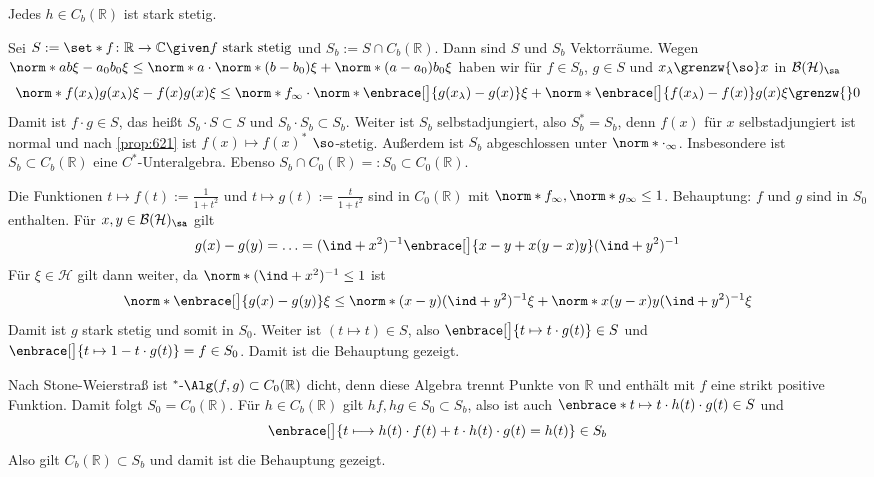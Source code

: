 \begin{proposition}[label=prop:623,{name=[jede beschränkte stetige Funktion ist stark stetig]}]
	Jedes $h \in C_b(\mathbb{R})$ ist stark stetig.
\end{proposition}
\begin{beweis}
	Sei $S := \set*{f \colon \mathbb{R}\to \mathbb{C} \given f \text{ stark stetig}}$ und $S_b := S \cap C_b(\mathbb{R})$.
	Dann sind $S$ und $S_b$ Vektorräume. 
	Wegen $\norm*{ab \xi - a_0 b_0 \xi} \le \norm*{a} \cdot \norm*{(b-b_0)\xi} + \norm*{(a-a_0)b_0\xi}$ haben wir für $f \in S_b$, $g \in S$ und $x_\lambda \grenzw{\so}x$ in $\mathcal{B}(\mathcal{H})_\sa$
	\[
		\norm*{f(x_\lambda) g(x_\lambda) \xi - f(x) g(x)\xi} \le \norm*{f}_\infty \cdot \norm*{\enbrace[\big]{g(x_\lambda)- g(x)}\xi} + \norm*{ \enbrace[\big]{f(x_\lambda)- f(x)} g(x) \xi}
		\grenzw{} 0
	\]
	Damit ist $f \cdot g \in S$, das heißt $S_b \cdot S \subset S$ und $S_b \cdot S_b \subset S_b$.
	Weiter ist $S_b$ selbstadjungiert, also $S_b^*=S_b$, denn  $f(x)$ für $x$ selbstadjungiert  ist normal und nach \autoref{prop:621} ist $f(x) \mapsto f(x)^*$ $\so$-stetig. 
	Außerdem ist $S_b$ abgeschlossen unter $\norm*{\cdot}_\infty$.
	Insbesondere ist $S_b \subset C_b(\mathbb{R})$ eine $C^*$-Unteralgebra.
	Ebenso $S_b \cap C_0(\mathbb{R}) =: S_0 \subset C_0(\mathbb{R})$.
	
	Die Funktionen $t \mapsto f(t):= \frac{1}{1+t^2}$ und $t \mapsto g(t) := \frac{t}{1+t^2}$ sind in $C_0(\mathbb{R})$ mit $\norm*{f}_\infty, \norm*{g}_\infty\le 1$.
	Behauptung: $f$ und $g$ sind in $S_0$ enthalten.
	Für $x,y \in \mathcal{B}(\mathcal{H})_\sa$ gilt 
	\[
		g(x)-g(y)= \ldots = (\ind+x^2)^{-1} \enbrace[\big]{x-y+x(y-x)y} (\ind+y^2)^{-1} 
	\]
	Für $\xi \in \mathcal{H}$ gilt dann weiter, da $\norm*{(\ind+x^2)^{-1}} \le 1$ ist
	\[
		\norm*{\enbrace[\big]{g(x)-g(y)}\xi} \le \norm*{(x-y)(\ind+y^2)^{-1} \xi} + \norm*{x(y-x) y(\ind+y^2)^{-1} \xi}
	\]
	Damit ist $g$ stark stetig und somit in $S_0$.
	Weiter ist $(t \mapsto t) \in S$, also $\enbrace[\big]{t \mapsto t \cdot g(t)} \in S$ und $\enbrace[\big]{t \mapsto 1-t \cdot g(t)}=f \in S_0$. 
	Damit ist die Behauptung gezeigt.
	
	Nach Stone-Weierstraß ist $^*\text{-}\Alg(f,g) \subset C_0(\mathbb{R})$ dicht, denn diese Algebra trennt Punkte von $\mathbb{R}$ und enthält mit $f$ eine strikt positive Funktion.
	Damit folgt $S_0=C_0(\mathbb{R})$.
	Für $h \in C_b(\mathbb{R})$ gilt $hf, hg \in S_0 \subset S_b$, also ist auch $\enbrace*{t \mapsto t \cdot h(t) \cdot g(t)} \in S$ und
	\[
		\enbrace[\big]{t \longmapsto h(t) \cdot f(t) + t \cdot h(t) \cdot g(t)=h(t)} \in S_b
	\]
	Also gilt $C_b(\mathbb{R}) \subset S_b$ und damit ist die Behauptung gezeigt.
\end{beweis}

